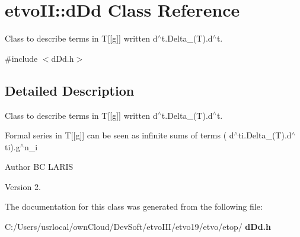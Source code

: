 \section{etvo\+II\+:\+:d\+Dd Class Reference}
\label{classetvo_i_i_1_1d_dd}


Class to describe terms in T[[g]] written d$^\wedge$t.Delta\+\_\+(\+T).d$^\wedge$t\textquotesingle{}.  




{\ttfamily \#include $<$d\+Dd.\+h$>$}



\subsection{Detailed Description}
Class to describe terms in T[[g]] written d$^\wedge$t.Delta\+\_\+(\+T).d$^\wedge$t\textquotesingle{}. 

Formal series in T[[g]] can be seen as infinite sums of terms ( d$^\wedge$ti.Delta\+\_\+(\+T).d$^\wedge$ti\textquotesingle{}).g$^\wedge$n\+\_\+i

\begin{DoxyAuthor}{Author}
BC L\+A\+R\+IS 
\end{DoxyAuthor}
\begin{DoxyVersion}{Version}
2. 
\end{DoxyVersion}


The documentation for this class was generated from the following file\+:\begin{DoxyCompactItemize}
\item 
C\+:/\+Users/usrlocal/own\+Cloud/\+Dev\+Soft/etvo\+I\+I\+I/etvo19/etvo/etop/\textbf{ d\+Dd.\+h}\end{DoxyCompactItemize}
